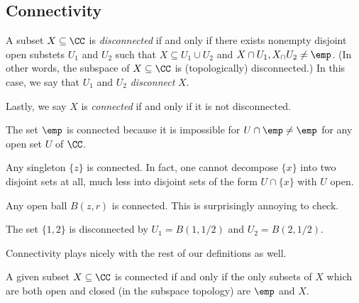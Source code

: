 \subsection{Connectivity}
\begin{definition}[Disconnected]
	A subset $X\subseteq\CC$ is \textit{disconnected} if and only if there exists nonempty disjoint open substets $U_1$ and $U_2$ such that $X\subseteq U_1\cup U_2$ and $X\cap U_1,X_\cap U_2\ne\emp$. (In other words, the subspace of $X\subseteq\CC$ is (topologically) disconnected.) In this case, we say that $U_1$ and $U_2$ \textit{disconnect} $X$.

	Lastly, we say $X$ is \textit{connected} if and only if it is not disconnected.
\end{definition}
\begin{example}
	The set $\emp$ is connected because it is impossible for $U\cap\emp\ne\emp$ for any open set $U$ of $\CC$.
\end{example}
\begin{example}
	Any singleton $\{z\}$ is connected. In fact, one cannot decompose $\{x\}$ into two disjoint sets at all, much less into disjoint sets of the form $U\cap\{x\}$ with $U$ open.
\end{example}
\begin{ex}
	Any open ball $B(z,r)$ is connected. This is surprisingly annoying to check. %
\end{ex}
\begin{example}
	The set $\{1,2\}$ is disconnected by $U_1=B(1,1/2)$ and $U_2=B(2,1/2)$.
\end{example}
Connectivity plays nicely with the rest of our definitions as well.
\begin{lemma}
	A given subset $X\subseteq\CC$ is connected if and only if the only subsets of $X$ which are both open and closed (in the subspace topology) are $\emp$ and $X$.
\end{lemma}
